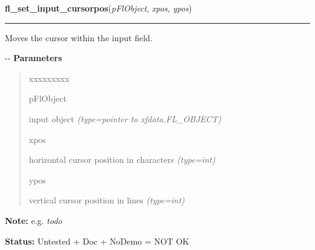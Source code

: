 \hspace{.8\funcindent}\begin{boxedminipage}{\funcwidth}

    \raggedright \textbf{fl\_set\_input\_cursorpos}(\textit{pFlObject}, \textit{xpos}, \textit{ypos})

    \vspace{-1.5ex}

    \rule{\textwidth}{0.5\fboxrule}
\setlength{\parskip}{2ex}

Moves the cursor within the input field.

-{}-
\setlength{\parskip}{1ex}
      \textbf{Parameters}
      \vspace{-1ex}

      \begin{quote}
        \begin{Ventry}{xxxxxxxxx}

          \item[pFlObject]


input object
            {\it (type=pointer to xfdata.FL\_OBJECT)}

          \item[xpos]


horizontal cursor position in characters
            {\it (type=int)}

          \item[ypos]


vertical cursor position in lines
            {\it (type=int)}

        \end{Ventry}

      \end{quote}

\textbf{Note:} 
e.g. \emph{todo}


\textbf{Status:} 
Untested + Doc + NoDemo = NOT OK


    \end{boxedminipage}

    \label{xformslib:flinput:fl_set_input_selected}

    \vspace{0.5ex}

